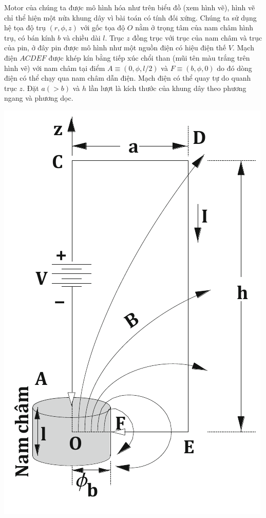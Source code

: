 \begin{loigiai}
Motor của chúng ta được mô hình hóa như trên biểu đồ (xem hình vẽ), hình vẽ chỉ thể hiện một nửa khung dây vì bài toán có tính đối xứng. Chúng ta sử dụng hệ tọa độ trụ $(r, \phi, z)$ với gốc tọa độ $O$ nằm ở trọng tâm của nam châm hình trụ, có bán kính $b$ và chiều dài $l$. Trục $z$ đồng trục với trục của nam châm và trục của pin, ở đây pin được mô hình như một nguồn điện có hiệu điện thế $V$. Mạch điện $ACDEF$ được khép kín bằng tiếp xúc chổi than (mũi tên màu trắng trên hình vẽ) với nam châm tại điểm $A \equiv (0,\phi,l/2)$ và $F \equiv (b, \phi, 0)$ do đó dòng điện có thể chạy qua nam châm dẫn điện. Mạch điện có thể quay tự do quanh trục $z$. Đặt $a (>b)$ và $h$ lần lượt là kích thước của khung dây theo phương ngang và phương dọc.
 \begin{center}
     \includegraphics[scale=0.6]{Anh/Nam_P3.pdf}

\end{center}
\end{loigiai}
